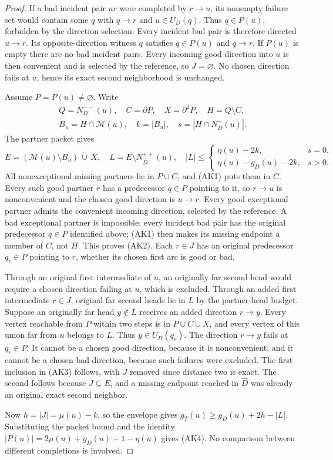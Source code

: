 \begin{proof}
If a bad incident pair $ur$ were completed by $r\to u$, its
nonempty failure set would contain some $q$ with $q\to r$ and
$u\in U_D(q)$. Thus $q\in P(u)$, forbidden by the direction
selection. Every incident bad pair is therefore directed $u\to r$.
Its opposite-direction witness $q$ satisfies $q\in P(u)$ and
$q\to r$. If $P(u)$ is empty there are no bad incident pairs.
Every incoming good direction into $u$ is then convenient and is
selected by the reference, so $J=\varnothing$. No chosen direction
fails at $u$, hence its exact second neighborhood is unchanged.

Assume $P=P(u)\ne\varnothing$. Write
\[
 \begin{gathered}
 Q=N_D^{--}(u),\quad C=\partial P,\quad X=\partial^2P,\quad H=Q\setminus C,\\
 B_u=H\cap\mathcal M(u),\quad k=|B_u|,\quad s=|H\cap N_D^+(u)|.
 \end{gathered}
\]
The partner packet gives
\[
 E=(\mathcal M(u)\setminus B_u)\,\dot\cup\,X,
 \quad L=E\setminus N_{\widehat D}^{++}(u),
 \quad |L|\le
 \begin{cases}\eta(u)-2k,&s=0,\\\eta(u)-g_D(u)-2k,&s>0.\end{cases}
\]
All nonexceptional missing partners lie in $P\cup C$, and (AK1)
puts them in $C$. Every such good partner $r$ has a predecessor
$q\in P$ pointing to it, so $r\to u$ is nonconvenient and the
chosen good direction is $u\to r$. Every good exceptional partner
admits the convenient incoming direction, selected by the reference.
A bad exceptional partner is impossible: every incident bad pair
has the original predecessor $q\in P$ identified above; (AK1)
then makes its missing endpoint a member of $C$, not $H$.
This proves (AK2). Each $r\in J$ has an original predecessor
$q_r\in P$ pointing to $r$, whether its chosen first arc is good
or bad.

Through an original first intermediate of $u$, an originally far
second head would require a chosen direction failing at $u$,
which is excluded. Through an added first intermediate $r\in J$,
original far second heads lie in $L$ by the partner-head budget.
Suppose an originally far head $y\notin L$ receives an added
direction $r\to y$. Every vertex reachable from $P$ within two
steps is in $P\cup C\cup X$, and every vertex of this union far
from $u$ belongs to $L$. Thus $y\in U_D(q_r)$. The direction
$r\to y$ fails at $q_r\in P$. It cannot be a chosen good
direction, because it is nonconvenient; and it cannot be a chosen
bad direction, because such failures were excluded. The first
inclusion in (AK3) follows, with $J$ removed since distance two
is exact. The second follows because $J\subseteq E$, and a
missing endpoint reached in $\widehat D$ was already an original
exact second neighbor.

Now $h=|J|=\mu(u)-k$, so the envelope gives
$g_T(u)\ge g_D(u)+2h-|L|$. Substituting the packet bound and
the identity $|P(u)|=2\mu(u)+g_D(u)-1-\eta(u)$ gives (AK4).
No comparison between different completions is involved.
\end{proof}

